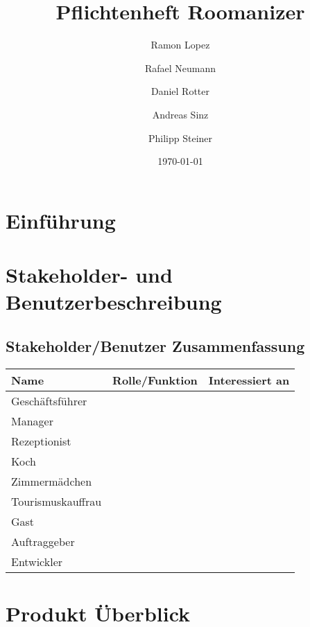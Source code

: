 \documentclass[10pt,a4paper,titlepage]{article}
\begin{document}
\fancyhf{}

\lhead{\leftmark}

\setcounter{secnumdepth}{5}
\setcounter{tocdepth}{3}

\title{Pflichtenheft Roomanizer}
\author{Ramon Lopez \and Rafael Neumann \and Daniel Rotter \and Andreas Sinz \and Philipp Steiner}
\date{\today}
\maketitle

\tableofcontents
\newpage

\section{Einführung}

\newpage

\section{Stakeholder- und Benutzerbeschreibung}

\subsection{Stakeholder\slash{}Benutzer Zusammenfassung}
\begin{tabular}{|l|l|l|}
    \hline
    \textbf{Name} & \textbf{Rolle\slash{}Funktion} & \textbf{Interessiert an} \\
    \hline
    Geschäftsführer &  &  \\
    \hline
    Manager &  & \\
    \hline
    Rezeptionist &  &  \\
    \hline
    Koch &  &  \\
    \hline
    Zimmermädchen &  &  \\
    \hline
    Tourismuskauffrau &  &  \\
    \hline
    Gast &  &  \\
    \hline
    Auftraggeber &  &  \\
    \hline
    Entwickler &  &  \\
    \hline
\end{tabular}

\newpage

\section{Produkt Überblick}
\end{document}
